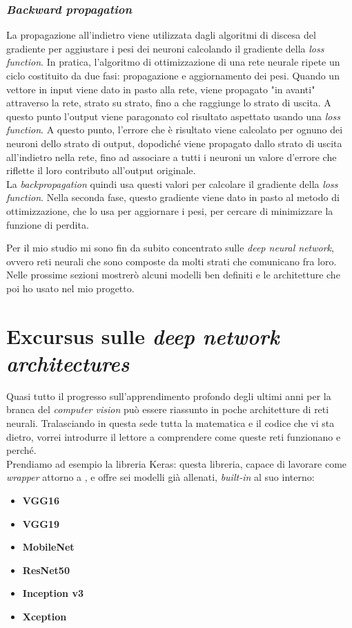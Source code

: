 \subsubsection*{\textit{Backward propagation}}
La propagazione all'indietro viene utilizzata dagli algoritmi di discesa del gradiente per aggiustare i pesi dei neuroni calcolando il gradiente della \textit{loss function}. In pratica, l'algoritmo di ottimizzazione di una rete neurale ripete un ciclo costituito da due fasi: propagazione e aggiornamento dei pesi. Quando un vettore in input viene dato in pasto alla rete, viene propagato "in avanti" attraverso la rete, strato su strato, fino a che raggiunge lo strato di uscita. A questo punto l'output viene paragonato col risultato aspettato usando una \textit{loss function}. A questo punto, l'errore che è risultato viene calcolato per ognuno dei neuroni dello strato di output, dopodiché viene propagato dallo strato di uscita all'indietro nella rete, fino ad associare a tutti i neuroni un valore d'errore che riflette il loro contributo all'output originale. 
\medskip
\\La \textit{backpropagation} quindi usa questi valori per calcolare il gradiente della \textit{loss function}. Nella seconda fase, questo gradiente viene dato in pasto al metodo di ottimizzazione, che lo usa per aggiornare i pesi, per cercare di minimizzare la funzione di perdita.

\medskip
\medskip
\medskip
Per il mio studio mi sono fin da subito concentrato sulle \textit{deep neural network}, ovvero reti neurali che sono composte da molti strati che comunicano fra loro. Nelle prossime sezioni mostrerò alcuni modelli ben definiti e le architetture che poi ho usato nel mio progetto.



\section{Excursus sulle \textit{deep network architectures}}
Quasi tutto il progresso sull'apprendimento profondo degli ultimi anni per la branca del \textit{computer vision} può essere riassunto in poche architetture di reti neurali.
Tralasciando in questa sede tutta la matematica e il codice che vi sta dietro, vorrei introdurre il lettore a comprendere come queste reti funzionano e perché.
\medskip
\\Prendiamo ad esempio la libreria Keras\cite{prod:keras}: questa libreria, capace di lavorare come \textit{wrapper} attorno a \cite{prod:tensorflow}, \cite{prod:CNTK} e \cite{prod:Theano} offre sei modelli già allenati, \textit{built-in} al suo interno:
\begin{itemize}
	\item \textbf{VGG16}
	\item \textbf{VGG19}
	\item \textbf{MobileNet}
	\item \textbf{ResNet50}
	\item \textbf{Inception v3}
	\item \textbf{Xception}
\end{itemize}

